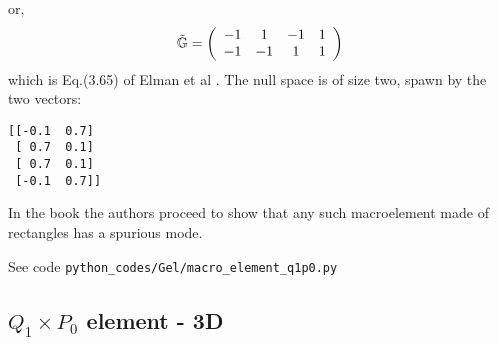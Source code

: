 or, 
\[
\tilde{{\mathbb{G}}} = 
\left(
\begin{array}{cccc}
 -1  &   1 &  -1 &   1  \\ 
 -1  &  -1 &   1 &   1  
\end{array}
\right)
\]
which is Eq.(3.65) of Elman et al \cite{elsw}.
The null space is of size two, spawn by the two vectors:
\begin{verbatim}
[[-0.1  0.7]
 [ 0.7  0.1]
 [ 0.7  0.1]
 [-0.1  0.7]]
\end{verbatim}

In the book the authors proceed to show that any such macroelement 
made of rectangles has a spurious mode. 

See code {\tt python\_codes/Gel/macro\_element\_q1p0.py}

\subsection{$Q_1\times P_0$ element - 3D}

